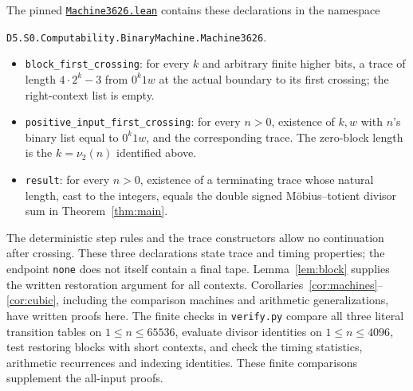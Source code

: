 \documentclass[11pt]{article}
\newcommand{\val}{\nu_2}
\begin{document}
The pinned \href{https://github.com/the-omega-institute/trureturing/blob/3d88df0f99ef3c8bfb034fa52be669b13746a844/D5/S0/Computability/BinaryMachine/Machine3626.lean}{\texttt{Machine3626.lean}}
contains these declarations in the namespace
\begin{center}
\small\texttt{D5.S0.Computability.BinaryMachine.Machine3626}.
\end{center}
\begin{itemize}
\item \texttt{block\_first\_crossing}: for every $k$ and arbitrary finite higher
bits, a trace of length $4\cdot2^k-3$ from $0^k1w$ at the actual boundary
to its first crossing; the right-context list is empty.
\item \texttt{positive\_input\_first\_crossing}: for every $n>0$, existence
of $k,w$ with $n$'s binary list equal to $0^k1w$, and the corresponding
trace. The zero-block length is the $k=\val(n)$ identified above.
\item \texttt{result}: for every $n>0$, existence of a terminating trace
whose natural length, cast to the integers, equals the double signed
M\"obius--totient divisor sum in Theorem~\ref{thm:main}.
\end{itemize}
The deterministic step rules and the trace constructors allow no continuation
after crossing. These three declarations state trace and timing properties;
the endpoint \texttt{none} does not itself contain a final tape.
Lemma~\ref{lem:block} supplies the written restoration argument for all
contexts. Corollaries~\ref{cor:machines}--\ref{cor:cubic}, including the
comparison machines and arithmetic generalizations, have written proofs here.
The finite checks in \texttt{verify.py} compare all three literal transition
tables on $1\leq n\leq65536$, evaluate divisor identities on
$1\leq n\leq4096$, test restoring blocks with short contexts, and check the
timing statistics, arithmetic recurrences and indexing identities.
These finite comparisons supplement the all-input proofs.
\end{document}
